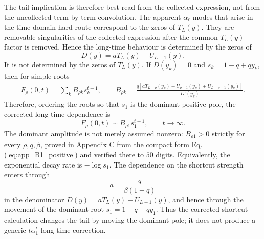 \documentclass[superscriptaddress, amsmath, amssymb, aps, pre, floatfix]{revtex4-2}
\begin{document}
The tail implication is therefore best read from the collected expression, not from the uncollected term-by-term convolution.  The apparent \(\alpha_\ell\)-modes that arise in the time-domain hard route correspond to the zeros of \(T_L(y)\).  They are removable singularities of the collected expression after the common \(T_L(y)\) factor is removed.  Hence the long-time behaviour is determined by the zeros of
\[
  D(y)=aT_L(y)+U_{L-1}(y).
\]
It is not determined by the zeros of \(T_L(y)\).  If \(D(y_k)=0\) and \(s_k=1-q+qy_k\), then for simple roots
\begin{align}
F_\rho(0,t)=\sum_k B_{\rho k}s_k^{t-1},\qquad
B_{\rho k}=\frac{q\left[aT_{L-\rho}(y_k)+U_{\rho-1}(y_k)+U_{L-\rho-1}(y_k)\right]}{D'(y_k)}.
\label{eq:tail_residue}
\end{align}
Therefore, ordering the roots so that \(s_1\) is the dominant positive pole, the corrected long-time dependence is
\[
  F_\rho(0,t)\sim B_{\rho 1}s_1^{t-1},\qquad t\to\infty.
\]
The dominant amplitude is not merely assumed nonzero: \(B_{\rho 1}>0\) strictly for every \(\rho,q,\beta\), proved in Appendix C from the compact form Eq. (\ref{eq:app_B1_positive}) and verified there to \(50\) digits.
Equivalently, the exponential decay rate is \(-\log s_1\).  The dependence on the shortcut strength enters through
\[
  a=\frac{q}{\beta(1-q)}
\]
in the denominator \(D(y)=aT_L(y)+U_{L-1}(y)\), and hence through the movement of the dominant root \(s_1=1-q+qy_1\).  Thus the corrected shortcut calculation changes the tail by moving the dominant pole; it does not produce a generic \(t\alpha_1^t\) long-time correction.
\end{document}
